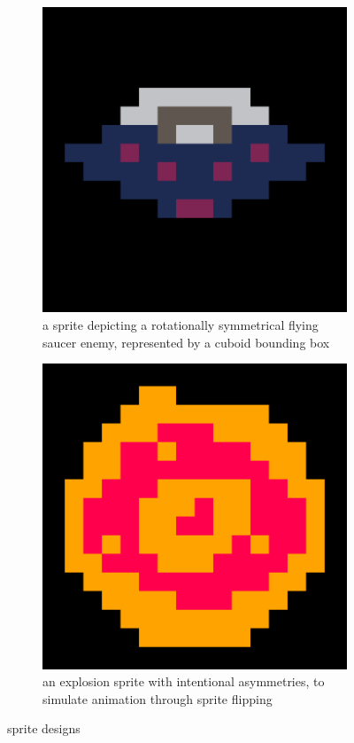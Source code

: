 \documentclass[11pt]{article}
\begin{document}
\begin{figure}[h]
\begin{subfigure}{.45\textwidth}
  \centering
  \includegraphics[width=.8\linewidth]{ship_sprite}
  \caption{a sprite depicting a rotationally symmetrical flying saucer enemy, represented by a cuboid
  bounding box}
  \label{fig:saucer}
\end{subfigure}\hfill
\begin{subfigure}{.45\textwidth}
  \centering
  \includegraphics[width=.8\linewidth]{explosion_sprite}
  \caption{an explosion sprite with intentional asymmetries, to simulate animation through sprite flipping}
  \label{fig:explosion_sprite}
\end{subfigure}\hfill
\caption{sprite designs}
\label{fig:sprites}
\end{figure}
\end{document}
